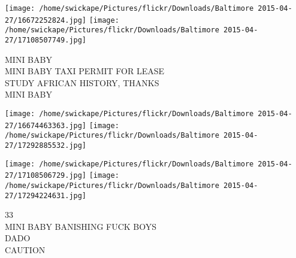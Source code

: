 \documentclass[10pt,letterpaper]{article}
\begin{document}
\texttt{[image: /home/swickape/Pictures/flickr/Downloads/Baltimore 2015-04-27/16672252824.jpg]}
\texttt{[image: /home/swickape/Pictures/flickr/Downloads/Baltimore 2015-04-27/17108507749.jpg]}

MINI BABY\\
MINI BABY TAXI PERMIT FOR LEASE\\
STUDY AFRICAN HISTORY, THANKS\\
MINI BABY\\
\pagebreak

\texttt{[image: /home/swickape/Pictures/flickr/Downloads/Baltimore 2015-04-27/16674463363.jpg]}
\texttt{[image: /home/swickape/Pictures/flickr/Downloads/Baltimore 2015-04-27/17292885532.jpg]}

\texttt{[image: /home/swickape/Pictures/flickr/Downloads/Baltimore 2015-04-27/17108506729.jpg]}
\texttt{[image: /home/swickape/Pictures/flickr/Downloads/Baltimore 2015-04-27/17294224631.jpg]}

33\\
MINI BABY BANISHING FUCK BOYS\\
DADO\\
CAUTION\\
\pagebreak
\end{document}

